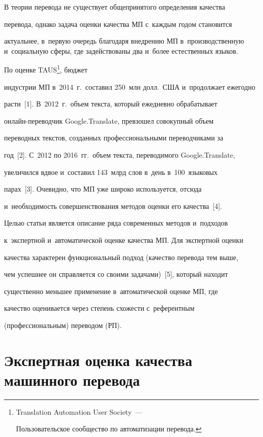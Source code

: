   

  В теории перевода не существует общепринятого определения качества 

перевода, однако задача оценки качества МП с~каждым годом становится 

актуальнее, в~первую очередь благодаря внедрению МП в~производственную и~социальную сферы, где задействованы два и~более естественных языков. 

По оценке TAUS\footnote[2]{Translation Automation User Society~--- 

Пользовательское сообщество по автоматизации перевода.}, бюджет 

индустрии МП в~2014~г.\ составил 250~млн долл.\ США и~продолжает ежегодно 

расти~[1]. В~2012~г.\ объем текста, который ежедневно обрабатывает 

онлайн-переводчик Google.Translate, превзошел совокупный объем 

переводных текстов, созданных профессиональными переводчиками за 

год~[2]. С~2012 по 2016~гг.\ объем текста, переводимого Google.Translate, 

увеличился вдвое и~составил 143~млрд слов в~день в~100~языковых 

парах~[3]. Очевидно, что МП уже широко используется, отсюда 

и~необходимость совершенствования методов оценки его качества~[4].

  

  Целью статьи является описание ряда современных методов и~подходов 

к~экспертной и~автоматической оценке качества МП. Для экспертной оценки 

качества характерен функциональный подход (качество перевода тем выше, 

чем успешнее он справляется со своими задачами)~[5], который находит 

существенно меньшее применение в~автоматической оценке МП, где 

качество оценивается через степень схожести с~референтным 

(профессиональным) переводом (РП).

  

  \section{Экспертная оценка качества машинного перевода}


